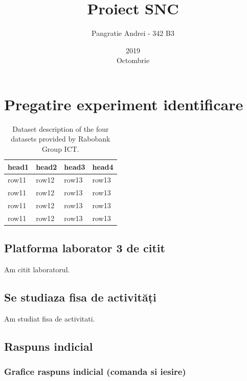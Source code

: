 \documentclass[12pt,english]{article}
\title{Proiect SNC}
\date{2019\\ Octombrie}
\author{Pangratie Andrei - 342 B3}
\begin{document}
\maketitle
\newpage

\tableofcontents
\newpage

\section { Pregatire experiment identificare }
\begin{table}[H]
  \centering
    \begin{tabular}{|l|l|l|l|}
      \hline
      head1 & head2 & head3 & head4 \\
      \hline
      row11 & row12 & row13 & row13 \\
      \hline
      row11 & row12 & row13 & row13 \\
      \hline
      row11 & row12 & row13 & row13 \\
      \hline
      row11 & row12 & row13 & row13 \\
      \hline
    \end{tabular}
    \caption{Dataset description of the four datasets provided by Rabobank Group ICT.}
\end{table}

\subsection { Platforma laborator 3 de citit }
	Am citit laboratorul.

\subsection { Se studiaza fisa de activități }
	Am studiat fisa de activitati.

\subsection { Raspuns indicial }
\subsubsection { Grafice raspuns indicial (comanda si iesire) }
	\begin{center}
	\end{center}
\end{document}
